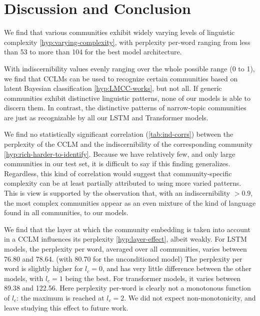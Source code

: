\documentclass[11pt,a4paper]{article}
\newcommand\bn[1]{\todo[backgroundcolor=green!10]{BN: #1}}
\begin{document}
\section{Discussion and Conclusion}

We find that various communities exhibit widely varying levels of
linguistic complexity \ref{hyp:varying-complexity}, with perplexity
per-word ranging from less than 53 to more than 104 for the best model
architecture.

With indiscernibility values evenly ranging over the whole possible
range (0 to 1), we find that CCLMs can be used to recognize certain
communities based on latent Bayesian classification
\ref{hyp:LMCC-works}, but not all.  If generic communities exhibit
distinctive linguistic patterns, none of our models is able to discern
them. In contrast, the distinctive patterns of narrow-topic
communities are just as recognizable by all our LSTM and Transformer
models.

We find no statistically significant correlation (\cref{tab:ind-corrs}) between the
perplexity of the
CCLM and the indiscernibility of the corresponding community
\ref{hyp:rich-harder-to-identify}. Because we have relatively few, and
only large communities in our test set, it is difficult to say if this
finding generalizes. Regardless, this kind of correlation would suggest that
community-specific complexity can be at least partially attributed to
using more varied patterns. This is view is supported by the
observation that, with an indiscernibility $> 0.9$, the most complex
communities appear as an even mixture of the kind of language found in
all communities, to our models.

We find that the layer at which the community embedding is taken into
account in a CCLM influences its perplexity \ref{hyp:layer-effect},
albeit weakly. For LSTM models, the perplexity per word, averaged over
all communities, varies between 76.80 and 78.64. (with 80.70 for the
unconditioned model) The perplexity per word is slightly higher for
$l_c=0$, and has very little difference between the other models, with
$l_c=1$ being the best.  For transformer models, it varies between
89.38 and 122.56. Here perplexity per-word is clearly not a monotonous
function of $l_c$: the maximum is reached at $l_c=2$. We did not
expect non-monotonicity, and leave studying this effect to future
work.
\end{document}
